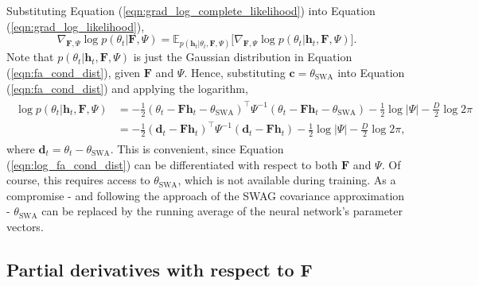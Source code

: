 \documentclass[msc,deptreport.inf]{infthesis} %
\newcommand{\matr}[1]{\mathbf{#1}}
\newcommand{\E}{\mathbb E}
\begin{document}
Substituting Equation (\ref{eqn:grad_log_complete_likelihood}) into Equation (\ref{eqn:grad_log_likelihood}),
\begin{equation}\label{eqn:simplified_grad_log_likelihood}
	\nabla_{\matr{F}, \Psi} \log p(\theta_t | \matr{F}, \Psi)
	= \E_{p(\matr{h}_t | \theta_t, \matr{F}, \Psi)} \big[ \nabla_{\matr{F}, \Psi} \log p(\theta_t | \matr{h}_t, \matr{F}, \Psi) \big].
\end{equation}
Note that $p(\theta_t | \matr{h}_t, \matr{F}, \Psi)$ is just the Gaussian distribution in Equation (\ref{eqn:fa_cond_dist}), given $\matr{F}$ and $\Psi$. Hence, substituting $\matr{c} = \theta_{\text{SWA}}$ into Equation (\ref{eqn:fa_cond_dist}) and applying the logarithm,
\begin{align}\label{eqn:log_fa_cond_dist}
\begin{split}
	\log p(\theta_t | \matr{h}_t, \matr{F}, \Psi)
	& = -\frac{1}{2} (\theta_t - \matr{Fh}_t - \theta_{\text{SWA}})^\intercal \Psi^{-1} (\theta_t - \matr{Fh}_t - \theta_{\text{SWA}}) - \frac{1}{2} \log |\Psi| - \frac{D}{2} \log 2\pi \\
	& = -\frac{1}{2} (\matr{d}_t - \matr{Fh}_t)^\intercal \Psi^{-1} (\matr{d}_t - \matr{Fh}_t) - \frac{1}{2} \log |\Psi| - \frac{D}{2} \log 2\pi,
\end{split}
\end{align}
where $\matr{d}_t = \theta_t - \theta_{\text{SWA}}$. This is convenient, since Equation (\ref{eqn:log_fa_cond_dist}) can be differentiated with respect to both $\matr{F}$ and $\Psi$. Of course, this requires access to $\theta_{\text{SWA}}$, which is not available during training. As a compromise - and following the approach of the SWAG covariance approximation - $\theta_{\text{SWA}}$ can be replaced by the running average of the neural network's parameter vectors.

\subsection{Partial derivatives with respect to $\matr{F}$}
\end{document}

